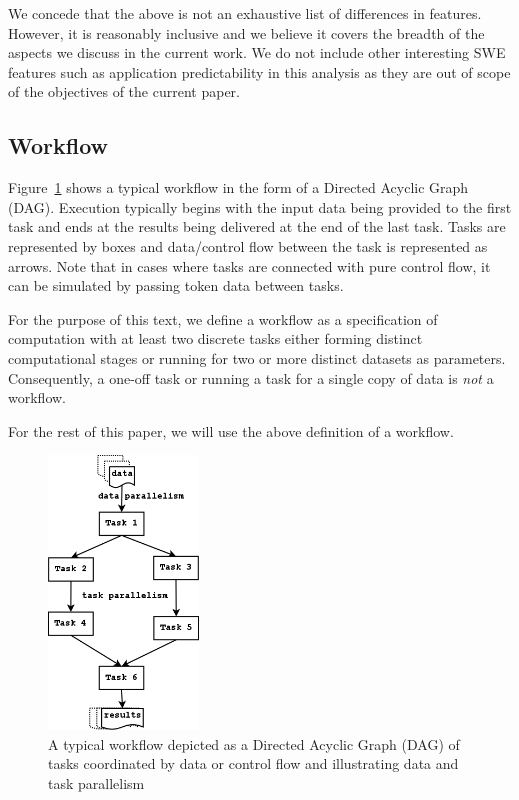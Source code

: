 We concede that the above is not an exhaustive list of differences in features.
However, it is reasonably inclusive and we believe it covers the breadth of the
aspects we discuss in the current work. We do not include other interesting SWE
features such as application predictability in this analysis as they are out of
scope of the objectives of the current paper.

\subsection{Workflow}
Figure~\ref{fig:wf} shows a typical workflow in the form of a Directed Acyclic
Graph (DAG). Execution typically begins with the input data being provided to
the first task and ends at the results being delivered at the end of the last
task. Tasks are represented by boxes and data/control flow between the task is
represented as arrows. Note that in cases where tasks are connected with pure
control flow, it can be simulated by passing token data between tasks.

For the purpose of this text, we define a workflow as a specification of
computation with at least two discrete tasks either forming distinct
computational stages or running for two or more distinct datasets as
parameters. Consequently, a one-off task or running a task for a single copy of
data is \emph{not} a workflow.

For the rest of this paper, we will use the above definition of a workflow.
%

\begin{figure}[htb]
\begin{center}
\includegraphics[width=4cm]{figures/workflow}
\caption{A typical workflow depicted as a Directed Acyclic Graph (DAG) of tasks coordinated by data or control flow and illustrating data and task parallelism}
\label{fig:wf}
\end{center}
\end{figure}
%

